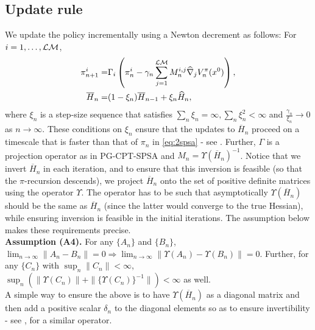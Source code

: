 \documentclass[11pt,letterpaper,english]{article}
\begin{document}
\subsection{Update rule}
We update the policy incrementally using a Newton decrement as follows: For $i=1,\ldots,\mathcal{L}\mathcal{M}$,
\begin{align}
\label{eq:2spsa}
\pi^{i}_{n+1} =& \Gamma_{i}\left(\pi^{i}_n - \gamma_n \sum_{j=1}^{\mathcal{L}\mathcal{M}} M_n^{i,j} \widehat\nabla_{j} V^\pi_n(x^0)\right), \\
\overline H_n = & (1-\xi_n) \overline H_{n-1} + \xi_n \widehat H_n,\label{eq:2spsa-H}
\end{align}
where $\xi_n$ is a step-size sequence that satisfies 
$\sum_{n} \xi_n = \infty, \sum_n \xi_n^2 < \infty$ and $\frac{\gamma_n}{\xi_n}\rightarrow 0$ as $n\rightarrow \infty$. These conditions on $\xi_n$ ensure that the updates to $\overline H_n$ proceed on a timescale that is faster than that of $\pi_n$ in \eqref{eq:2spsa} - see \cite[Chapter 6]{borkar2008stochastic}.
Further, $\Gamma$ is a projection operator as in PG-CPT-SPSA and  $M_n = \Upsilon(\overline H_n)^{-1}$.
Notice that we invert $\overline H_n$ in each iteration, and to ensure that this inversion is feasible (so that the $\pi$-recursion descends), we project $\overline H_n$ onto the set of positive definite matrices using the operator $\Upsilon$. The operator has to be such that asymptotically $\Upsilon(\overline H_n)$ should be the same as $\overline H_n$ (since the latter would converge to the true Hessian), while ensuring inversion is feasible in the initial iterations.  The assumption below makes these requirements precise.\\[1ex]
\textbf{Assumption (A4).}  For any $\{A_n\}$ and $\{B_n\}$,
${\displaystyle \lim_{n\rightarrow \infty} \left\| A_n-B_n \right\|}= 0 \Rightarrow {\displaystyle \lim_{n\rightarrow \infty} \parallel \Upsilon(A_n)- \Upsilon(B_n) \parallel}= 0$. Further, for any $\{C_n\}$  with
${\displaystyle \sup_n \parallel C_n\parallel}<\infty$,
${\displaystyle \sup_n \left(\parallel \Upsilon(C_n)\parallel + \parallel \{\Upsilon(C_n)\}^{-1} \parallel\right) < \infty}$
as well.
\\[0.5ex]
A simple way to ensure the above is to have $\Upsilon(\overline H_n)$ as a diagonal matrix and then add a positive scalar $\delta_n$ to the diagonal elements so as to ensure invertibility  - see \cite{gill1981practical}, \cite{spall2000adaptive} for a similar operator.
\end{document}
